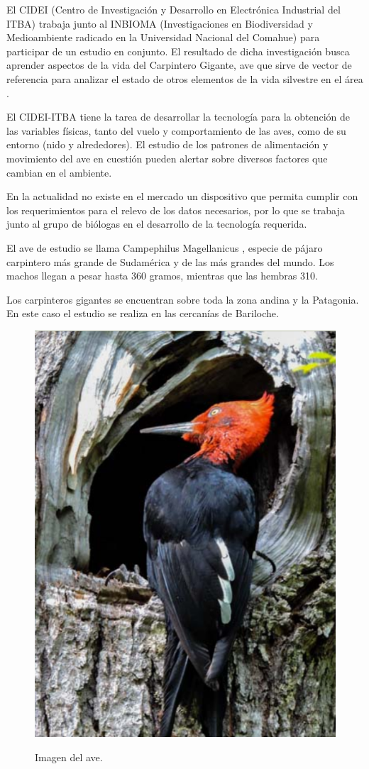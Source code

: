 El CIDEI (Centro de Investigación y Desarrollo en Electrónica Industrial del ITBA) trabaja junto al INBIOMA (Investigaciones en Biodiversidad y Medioambiente radicado en la Universidad Nacional del Comahue) para participar de un estudio en conjunto. El resultado de dicha investigación busca aprender aspectos de la vida del Carpintero Gigante, ave que sirve de vector de referencia para analizar el estado de otros elementos de la vida silvestre en el área \cite{ref:PaperValeriaOjeda}.

El CIDEI-ITBA tiene la tarea de desarrollar la tecnología para la obtención de las variables físicas, tanto del vuelo y comportamiento de las aves, como de su entorno (nido y alrededores). El estudio de los patrones de alimentación y movimiento del ave en cuestión pueden alertar sobre diversos factores que cambian en el ambiente.

En la actualidad no existe en el mercado un dispositivo que permita cumplir con los requerimientos para el relevo de los datos necesarios, por lo que se trabaja junto al grupo de biólogas en el desarrollo de la tecnología requerida.

El ave de estudio se llama Campephilus Magellanicus , especie de pájaro carpintero más grande de Sudamérica y de las más grandes del mundo. Los machos llegan a pesar hasta 360 gramos, mientras que las hembras 310.

Los carpinteros gigantes se encuentran sobre toda la zona andina y la Patagonia. En este caso el estudio se realiza en las cercanías de Bariloche. 
\begin{figure}[H]
	\centering
	\includegraphics[width=0.4\linewidth]{ImagenesIntroduccion/pajaro}
	\label{fig:pajaro}
	\caption{Imagen del ave.}
\end{figure}

